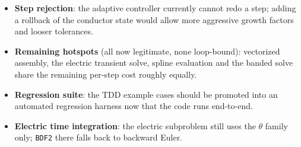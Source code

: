 \documentclass[11pt,a4paper]{article}
\newcommand{\code}[1]{\texttt{#1}}
\begin{document}
\begin{itemize}
  \item \textbf{Step rejection}: the adaptive controller currently cannot redo a step;
        adding a rollback of the conductor state would allow more aggressive growth
        factors and looser tolerances.
  \item \textbf{Remaining hotspots} (all now legitimate, none loop-bound):
        vectorized assembly, the electric transient solve, spline evaluation and the
        banded solve share the remaining per-step cost roughly equally.
  \item \textbf{Regression suite}: the TDD example cases should be promoted into an
        automated regression harness now that the code runs end-to-end.
  \item \textbf{Electric time integration}: the electric subproblem still uses the
        $\theta$ family only; \code{BDF2} there falls back to backward Euler.
\end{itemize}
\end{document}
